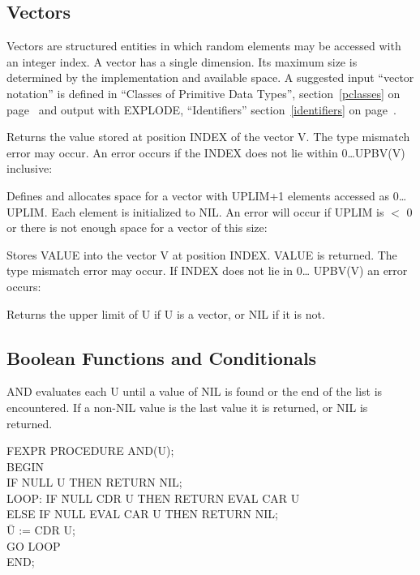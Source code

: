 \subsection{Vectors}
\label{vectors}
Vectors are structured entities in which random elements may be
accessed with an integer index. A vector has a single dimension. Its
maximum size is determined by the implementation and available space.
A suggested input ``vector notation'' is defined in ``Classes of
Primitive Data Types'', section~\ref{pclasses} on
page~\pageref{pclasses} and output with EXPLODE, ``Identifiers''
section~\ref{identifiers} on page~\pageref{identifiers}.


{Returns the value stored at position INDEX of the vector V. The type
mismatch error may occur. An error occurs if the INDEX does not lie
within 0\ldots UPBV(V) inclusive:

}


{Defines and allocates space for a vector with UPLIM+1 elements
accessed as 0\ldots UPLIM. Each element is initialized to NIL. An
error will occur if UPLIM is $<$ 0 or there is not enough space for a
vector of this size:

}


{Stores VALUE into the vector V at position INDEX. VALUE is returned.
The type mismatch error may occur. If INDEX does not lie in 0\ldots
UPBV(V) an error occurs:

}


{Returns the upper limit of U if U is a vector, or NIL if it is not.}


\subsection{Boolean Functions and Conditionals}


{AND evaluates each U until a value of NIL is found or the end of the
list is encountered. If a non-NIL value is the last value it is
returned, or NIL is returned.

{\tt \begin{tabbing} FEXPR PROCEDURE AND(U); \\ BEGIN \\
\hspace*{1em} IF NULL U THEN RETURN NIL; \\
LOOP: IF \= NULL CDR U THEN RETURN EVAL CAR U \\
\> ELSE IF NULL EVAL CAR U THEN RETURN NIL; \\
\hspace*{2em} \= U := CDR U; \\
\> GO LOOP \\
END;
\end{tabbing} }}


